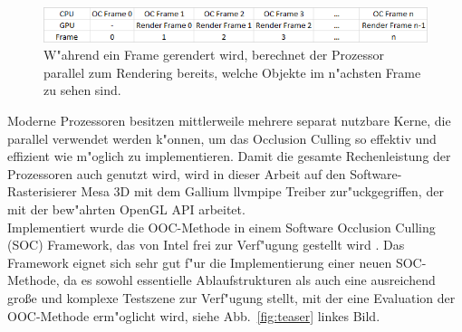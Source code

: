 \documentclass[journal]{vgtc}
\begin{document}
\begin{figure}%
\includegraphics[width=\columnwidth]{images/Ablauf.PNG}%
\caption{W"ahrend ein Frame gerendert wird, berechnet der Prozessor parallel zum Rendering bereits, welche Objekte im n"achsten Frame zu sehen sind.}%
\label{fig:ablauf}%
\end{figure}

Moderne Prozessoren besitzen mittlerweile mehrere separat nutzbare Kerne, die parallel verwendet werden k"onnen, um das Occlusion Culling so effektiv und effizient wie m"oglich zu implementieren.
Damit die gesamte Rechenleistung der Prozessoren auch genutzt wird, wird in dieser Arbeit auf den Software-Rasterisierer Mesa 3D mit dem Gallium llvmpipe Treiber zur"uckgegriffen, der mit der bew"ahrten OpenGL API arbeitet.\\

Implementiert wurde die OOC-Methode in einem Software Occlusion Culling (SOC) Framework, das von Intel frei zur Verf"ugung gestellt wird \cite{SOCF}.
Das Framework eignet sich sehr gut f"ur die Implementierung einer neuen SOC-Methode, da es sowohl essentielle Ablaufstrukturen als auch eine ausreichend gro{\ss}e und komplexe Testszene zur Verf"ugung stellt, mit der eine Evaluation der OOC-Methode erm"oglicht wird, siehe Abb.\ \ref{fig:teaser} linkes Bild.
\end{document}
